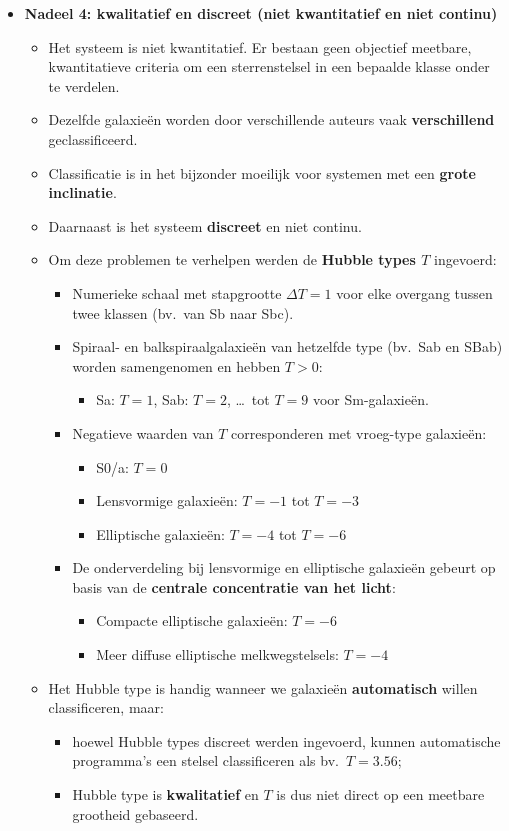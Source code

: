 \documentclass[10pt,a4paper]{article}
\begin{document}
\begin{itemize}
  \item \textbf{Nadeel 4: kwalitatief en discreet (niet kwantitatief en niet continu)}
  \begin{itemize}
    \item Het systeem is niet kwantitatief. Er bestaan geen objectief meetbare, kwantitatieve criteria om een sterrenstelsel in een bepaalde klasse onder te verdelen.
    \item Dezelfde galaxieën worden door verschillende auteurs vaak \textbf{verschillend} geclassificeerd.
    \item Classificatie is in het bijzonder moeilijk voor systemen met een \textbf{grote inclinatie}.
    \item Daarnaast is het systeem \textbf{discreet} en niet continu.
    \item Om deze problemen te verhelpen werden de \textbf{Hubble types $T$} ingevoerd:
    \begin{itemize}
      \item Numerieke schaal met stapgrootte $\Delta T = 1$ voor elke overgang tussen twee klassen (bv.\ van Sb naar Sbc).
      \item Spiraal- en balkspiraalgalaxieën van hetzelfde type (bv.\ Sab en SBab) worden samengenomen en hebben $T > 0$:
      \begin{itemize}
        \item Sa: $T=1$, Sab: $T=2$, \dots\ tot $T=9$ voor Sm-galaxieën.
      \end{itemize}
      \item Negatieve waarden van $T$ corresponderen met vroeg-type galaxieën:
      \begin{itemize}
        \item S0/a: $T=0$
        \item Lensvormige galaxieën: $T=-1$ tot $T=-3$
        \item Elliptische galaxieën: $T=-4$ tot $T=-6$
      \end{itemize}
      \item De onderverdeling bij lensvormige en elliptische galaxieën gebeurt op basis van de \textbf{centrale concentratie van het licht}:
      \begin{itemize}
        \item Compacte elliptische galaxieën: $T=-6$
        \item Meer diffuse elliptische melkwegstelsels: $T=-4$
      \end{itemize}
    \end{itemize}
    \item Het Hubble type is handig wanneer we galaxieën \textbf{automatisch} willen classificeren, maar:
    \begin{itemize}
      \item hoewel Hubble types discreet werden ingevoerd, kunnen automatische programma’s een stelsel classificeren als bv.\ $T = 3.56$;
      \item Hubble type is \textbf{kwalitatief} en $T$ is dus niet direct op een meetbare grootheid gebaseerd.
    \end{itemize}
  \end{itemize}


\end{itemize}
\end{document}
